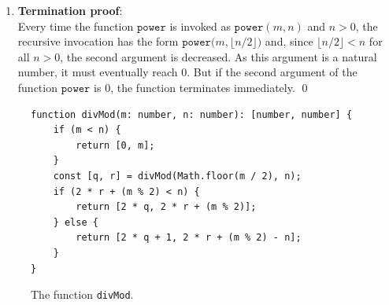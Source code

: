 \begin{enumerate}
\begin{enumerate}
            Then there exists a number $k \in \mathbb{N}$ such that $n = 2 \cdot k + 1$ and we have
            $\lfloor n / 2 \rfloor = k$.  In this case we have:
            \\[0.2cm]
            \hspace*{1.3cm}
            $ 
            \begin{array}{lcl}
            \mathtt{power}(m,n) & = & \mathtt{power}(m,k) \cdot \mathtt{power}(m,k) \cdot m  \\[0.2cm]
                                & \stackrel{\mathrm{IV}}{=} & m^k \cdot m^k \cdot m  \\[0.2cm]
                                & = & m^{2\cdot k+1} \\[0.2cm]
                                & = & m^{n}.
            \end{array}
            $
      \end{enumerate}
      As we have shown that $\mathtt{power}(m,n) = m^n$ in both cases, the induction step is finished. \mycheck
\item \textbf{Termination proof}: \\
      Every time the function $\mathtt{power}$ is invoked as $\mathtt{power}(m, n)$ and $n > 0$, the recursive
      invocation has the form $\mathtt{power}\bigl(m, \lfloor n / 2 \rfloor\bigr)$ and, since
    $\lfloor n / 2 \rfloor < n$ for all $n > 0$, the second
      argument is decreased.  As this argument is a natural number, it must eventually reach $0$.  But if the
      second argument of the function $\mathtt{power}$ is $0$, the function terminates immediately. \mycheck
      \qed
\end{enumerate}

\begin{figure}[!h]
  \centering
\begin{verbatim}
function divMod(m: number, n: number): [number, number] {
    if (m < n) {
        return [0, m];
    }
    const [q, r] = divMod(Math.floor(m / 2), n);
    if (2 * r + (m % 2) < n) {
        return [2 * q, 2 * r + (m % 2)];
    } else {
        return [2 * q + 1, 2 * r + (m % 2) - n];
    }
}
\end{verbatim}
\vspace*{-0.3cm}
  \caption{The function \texttt{divMod}.}
  \label{fig:div_mod}
\end{figure} 


